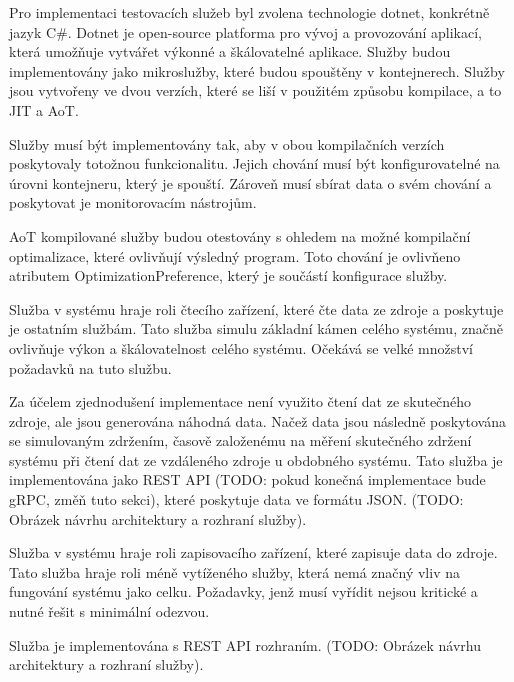 
Pro implementaci testovacích služeb byl zvolena technologie dotnet, konkrétně jazyk C\#. Dotnet je open-source platforma pro vývoj a provozování aplikací, která umožňuje vytvářet výkonné a škálovatelné aplikace. Služby budou implementovány jako mikroslužby, které budou spouštěny v kontejnerech. Služby jsou vytvořeny ve dvou verzích, které se liší v použitém způsobu kompilace, a to JIT a AoT.



Služby musí být implementovány tak, aby v obou kompilačních verzích poskytovaly totožnou funkcionalitu. Jejich chování musí být konfigurovatelné na úrovni kontejneru, který je spouští. Zároveň musí sbírat data o svém chování a poskytovat je monitorovacím nástrojům.

AoT kompilované služby budou otestovány s ohledem na možné kompilační optimalizace, které ovlivňují výsledný program. Toto chování je ovlivňeno atributem OptimizationPreference, který je součástí konfigurace služby.



Služba v systému hraje roli čtecího zařízení, které čte data ze zdroje a poskytuje je ostatním službám. Tato služba simulu základní kámen celého systému, značně ovlivňuje výkon a škálovatelnost celého systému. Očekává se velké množství požadavků na tuto službu.

Za účelem zjednodušení implementace není využito čtení dat ze skutečného zdroje, ale jsou generována náhodná data. Načež data jsou následně poskytována se simulovaným zdržením, časově založenému na měření skutečného zdržení systému při čtení dat ze vzdáleného zdroje u obdobného systému. Tato služba je implementována jako REST API (TODO: pokud konečná implementace bude gRPC, změň tuto sekci), které poskytuje data ve formátu JSON. (TODO: Obrázek návrhu architektury a rozhraní služby).


Služba v systému hraje roli zapisovacího zařízení, které zapisuje data do zdroje. Tato služba hraje roli méně vytíženého služby, která nemá značný vliv na fungování systému jako celku. Požadavky, jenž musí vyřídit nejsou kritické a nutné řešit s minimální odezvou.

Služba je implementována s REST API rozhraním. (TODO: Obrázek návrhu architektury a rozhraní služby).

